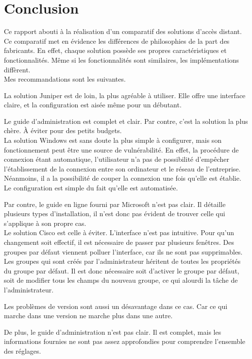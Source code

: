 \chapter*{Conclusion}
Ce rapport abouti à la réalisation d'un comparatif des solutions d'accès distant.
Ce comparatif met en évidence les différences de philosophies de la part des fabricants.
En effet, chaque solution possède ses propres caractéristiques et fonctionnalités.
Même si les fonctionnalités sont similaires, les implémentations diffèrent.\\

Mes recommandations sont les suivantes.

La solution Juniper est de loin, la plus agréable à utiliser.
Elle offre une interface claire, et la configuration est aisée même pour un débutant.

Le guide d'administration est complet et clair.
Par contre, c'est la solution la plus chère.
À éviter pour des petits budgets.\\

La solution Windows est sans doute la plus simple à configurer, mais son fonctionnement peut être une source de vulnérabilité.
En effet, la procédure de connexion étant automatique, l'utilisateur n'a pas de possibilité d'empêcher l'établissement de la connexion entre son ordinateur et le réseau de l'entreprise.
Néanmoins, il a la possibilité de couper la connexion une fois qu'elle est établie.
Le configuration est simple du fait qu'elle est automatisée.

Par contre, le guide en ligne fourni par Microsoft n'est pas clair.
Il détaille plusieurs types d'installation, il n'est donc pas évident de trouver celle qui s'applique à son propre cas.\\

Le solution Cisco est celle à éviter.
L'interface n'est pas intuitive.
Pour qu'un changement soit effectif, il est nécessaire de passer par plusieurs fenêtres.
Des groupes par défaut viennent polluer l'interface, car ils ne sont pas supprimables.
Les groupes qui sont créés par l'administrateur héritent de toutes les propriétés du groupe par défaut.
Il est donc nécessaire soit d'activer le groupe par défaut, soit de modifier tous les champs du nouveau groupe, ce qui alourdi la tâche de l'administrateur.

Les problèmes de version sont aussi un désavantage dans ce cas.
Car ce qui marche dans une version ne marche plus dans une autre.

De plus, le guide d'administration n'est pas clair.
Il est complet, mais les informations fournies ne sont pas assez approfondies pour comprendre l'ensemble des réglages.
 